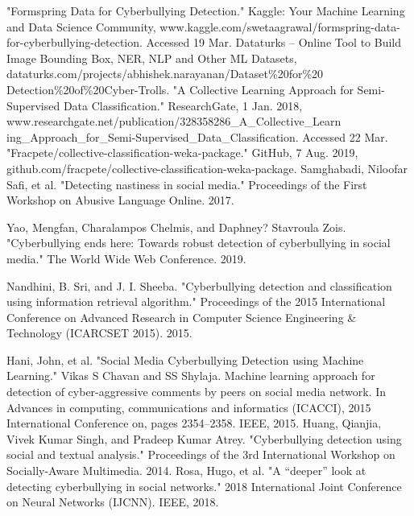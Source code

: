 \documentclass[10pt,conference]{IEEEtran}
\begin{document}
\begin{thebibliography}{00}
 "Formspring Data for Cyberbullying Detection." Kaggle: Your Machine Learning and Data Science Community, www.kaggle.com/swetaagrawal/formspring-data-for-cyberbullying-detection. Accessed 19 Mar. 
 Dataturks – Online Tool to Build Image Bounding Box, NER, NLP and Other ML Datasets, dataturks.com/projects/abhishek.narayanan/Dataset\%20for\%20
Detection\%20of\%20Cyber-Trolls. 
 "A Collective Learning Approach for Semi-Supervised Data Classification." ResearchGate, 1 Jan. 2018, www.researchgate.net/publication/328358286\_A\_Collective\_Learn
ing\_Approach\_for\_Semi-Supervised\_Data\_Classification. Accessed 22 Mar. 
 "Fracpete/collective-classification-weka-package." GitHub, 7 Aug. 2019, github.com/fracpete/collective-classification-weka-package.
Samghabadi, Niloofar Safi, et al. "Detecting nastiness in social media." Proceedings of the First Workshop on Abusive Language Online. 2017.

Yao, Mengfan, Charalampos Chelmis, and Daphney? Stavroula Zois. "Cyberbullying ends here: Towards robust detection of cyberbullying in social media." The World Wide Web Conference. 2019.

Nandhini, B. Sri, and J. I. Sheeba. "Cyberbullying detection and classification using information retrieval algorithm." Proceedings of the 2015 International Conference on Advanced Research in Computer Science Engineering & Technology (ICARCSET 2015). 2015.

Hani, John, et al. "Social Media Cyberbullying Detection using Machine Learning."
Vikas S Chavan and SS Shylaja. Machine learning approach for detection of cyber-aggressive comments by peers on social media network. In Advances in computing, communications and informatics (ICACCI), 2015 International Conference on, pages 2354–2358. IEEE, 2015. 
Huang, Qianjia, Vivek Kumar Singh, and Pradeep Kumar Atrey. "Cyberbullying detection using social and textual analysis." Proceedings of the 3rd International Workshop on Socially-Aware Multimedia. 2014.
Rosa, Hugo, et al. "A “deeper” look at detecting cyberbullying in social networks." 2018 International Joint Conference on Neural Networks (IJCNN). IEEE, 2018.

\end{thebibliography}

\clearpage

\appendices
\end{document}
